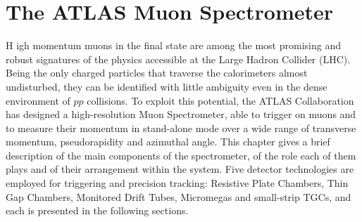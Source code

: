 \documentclass[11pt,a4paper,twoside,openright]{report}
\begin{document}
\clearpage

\chapter{The ATLAS Muon Spectrometer}
\lettrine[lines=3,loversize=0.1,lraise=0.05]{H}{} igh momentum muons in the final state are among the most promising and robust signatures of the physics accessible at the Large Hadron Collider (LHC). Being the only charged particles that traverse the calorimeters almost undisturbed, they can be identified with little ambiguity even in the dense environment of \(pp\) collisions. To exploit this potential, the ATLAS Collaboration has designed a high-resolution Muon Spectrometer, able to trigger on muons and to measure their momentum in stand-alone mode over a wide range of transverse momentum, pseudorapidity and azimuthal angle. This chapter gives a brief description of the main components of the spectrometer, of the role each of them plays and of their arrangement within the system. Five detector technologies are employed for triggering and precision tracking: Resistive Plate Chambers, Thin Gap Chambers, Monitored Drift Tubes, Micromegas and small-strip TGCs, and each is presented in the following sections.
\end{document}
